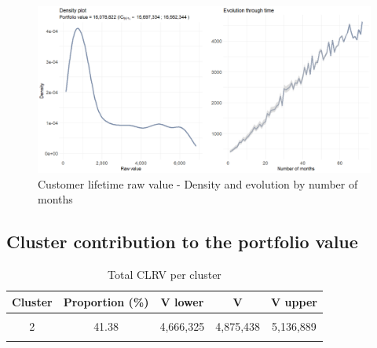 \documentclass[
]{book}
\begin{document}
\begin{figure}

{\centering \includegraphics[width=19.44in]{./imgs/cust_lifetime_raw_value} 

}

\caption{Customer lifetime raw value - Density and evolution by number of months}\label{fig:custrawvaldens}
\end{figure}

\hypertarget{cluster-contribution-to-the-portfolio-value}{%
\subsection{Cluster contribution to the portfolio value}\label{cluster-contribution-to-the-portfolio-value}}

\begin{table}[H]

\caption{\label{tab:totValclust}Total CLRV per cluster}
\centering
\begin{tabular}[t]{ccccc}
\toprule
Cluster & Proportion (\%) & V lower & V & V upper\\
\midrule
\cellcolor{gray!6}{1} & \cellcolor{gray!6}{26.55} & \cellcolor{gray!6}{1,748,207} & \cellcolor{gray!6}{1,809,489} & \cellcolor{gray!6}{1,889,476}\\
2 & 41.38 & 4,666,325 & 4,875,438 & 5,136,889\\
\cellcolor{gray!6}{3} & \cellcolor{gray!6}{32.07} & \cellcolor{gray!6}{9,282,801} & \cellcolor{gray!6}{9,393,895} & \cellcolor{gray!6}{9,535,978}\\
\bottomrule
\end{tabular}
\end{table}
\end{document}
